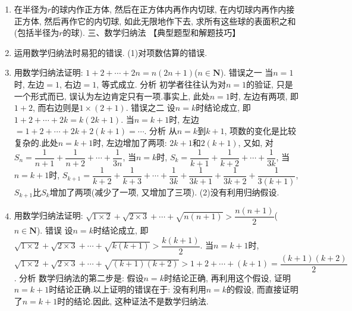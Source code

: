\documentclass[10pt,a4paper]{article}
\newcommand{\blank}[1]{\underline{\hbox to #1pt{}}}
\begin{document}
\begin{enumerate}[1.]
(2)如图, 在直角坐标平面上, 点$P$从原点出发沿$x$轴的正方向前进$a$后向左转90°, 前进$\dfrac a2$后又向右转90, 前进$\dfrac 1{2^2}a$后再左转90°, 无限地继续下去, 点$P$最后到达哪一点.
    (第133(2)题)\blank{50}(第133(3)题)\blank{50}(第133(4)题)
(3)设扇形$AOB$的半径为$R$, 中心角为$\theta$($0<\theta <\dfrac{\pi }2$), 由$A$向半径$OB$作垂线$AB_1$, 由垂足$B_1$引弦$AB$的平行线交$OA$于点$A_1$, 再由$A_1$向$OB$作垂线$A_1B_2$, 由垂足$B_2$引弦$AB$的平行线交$OA$于点$A_2$(如图), 这样无限地继续下去, 在$OA$, $OB$上得到的点列$\{A_n\}$、$\{B_n\}$, 设$\triangle ABB_1$, $\triangle A_1B_1B_2$, …, $\triangle A_nB_nB_{n+1}$, …的面积为$S_1$, $S_2$, …, $S_{n+1}$, …, 求$S=\displaystyle \lim_{n\to \infty} \sum\limits_{k=1}^nS_k$.
(4)如图, 在Rt$\triangle ABC$中排列着无限个正方形$S_1$, $S_2$, $S_3$, $S_4$, …, 且已知直角边$BC=a$, 这无限个正方形的面积之和正好是这个直角三角形面积的一半, 求另一直角边$AC$的长.
\item 在半径为$r$的球内作正方体, 然后在正方体内再作内切球, 在内切球内再作内接正方体, 然后再作它的内切球, 如此无限地作下去, 求所有这些球的表面积之和(包括半径为$r$的球).
三、数学归纳法
【典型题型和解题技巧】
\item 运用数学归纳法时易犯的错误.
(1)对项数估算的错误.
\item 用数学归纳法证明: $1+2+\cdots +2n=n(2n+1)$($n\in \mathbf{N}$).
错误之一  当$n=1$时, 左边$=1$, 右边$=1$, 等式成立.
分析  初学者往往认为对$n=1$的验证, 只是一个形式而已, 误认为左边肯定只有一项.事实上, 此处$n=1$时, 左边有两项, 即$1+2$, 而右边则是$1\times (2+1)$.
错误之二  设$n=k$时结论成立, 即$1+2+\cdots +2k=k(2k+1)$.
当$n=k+1$时, 左边$=1+2+\cdots +2k+2(k+1)=\cdots$.
分析  从$n=k$到$k+1$, 项数的变化是比较复杂的.此处$n=k+1$时, 左边增加了两项: $2k+1$和$2(k+1)$, 又如, 对$S_n=\dfrac 1{n+1}+\dfrac 1{n+2}+\cdots +\dfrac 1{3n}$,
当$n=k$时, $S_k=\dfrac 1{k+1}+\dfrac 1{k+2}+\cdots +\dfrac 1{3k}$,
当$n=k+1$时, $S_{k+1}=\dfrac 1{k+2}+\dfrac 1{k+3}+\cdots +\dfrac 1{3k}+\dfrac 1{3k+1}+\dfrac 1{3k+2}+\dfrac 1{3(k+1)}$,
$S_{k+1}$比$S_k$增加了两项(减少了一项, 又增加了三项).
(2)没有利用归纳假设.
\item 用数学归纳法证明: $\sqrt {1\times 2}+\sqrt {2\times 3}+\cdots +\sqrt {n(n+1)}>\dfrac{n(n+1)}2$($n\in \mathbf{N}$).
错误  设$n=k$时结论成立, 即$\sqrt {1\times 2}+\sqrt {2\times 3}+\cdots +\sqrt {k(k+1)}>\dfrac{k(k+1)}2$.
当$n=k+1$时,
$\sqrt {1\times 2}+\sqrt {2\times 3}+\cdots +\sqrt {(k+1)(k+2)}>1+2+\cdots +(k+1)=\dfrac{(k+1)(k+2)}2$.
分析  数学归纳法的第二步是: 假设$n=k$时结论正确, 再利用这个假设, 证明$n=k+1$时结论正确.以上证明的错误在于: 没有利用$n=k$的假设, 而直接证明了$n=k+1$时的结论.因此, 这种证法不是数学归纳法.

\end{enumerate}
\end{document}
